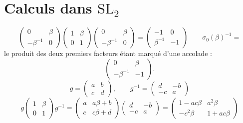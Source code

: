 \documentclass[11pt,a4paper]{article}
\begin{document}
\section{Calculs dans $\mathrm{SL}_2$}

\[
\begin{pmatrix} 0 & \beta \\ -\beta^{-1} & 0 \end{pmatrix}
\begin{pmatrix} 1 & \beta \\ 0 & 1 \end{pmatrix}
\begin{pmatrix} 0 & \beta \\ -\beta^{-1} & 0 \end{pmatrix}
= \begin{pmatrix} -1 & 0 \\ \beta^{-1} & -1 \end{pmatrix}
\qquad \sigma_0(\beta)^{-1} =
\]
le produit des deux premiers facteurs étant marqué d'une accolade :
\[
\begin{pmatrix} 0 & \beta \\ -\beta^{-1} & -1 \end{pmatrix}.
\]
\[
g = \begin{pmatrix} a & b \\ c & d \end{pmatrix}, \qquad
g^{-1} = \begin{pmatrix} d & -b \\ -c & a \end{pmatrix}
\]
\[
g \begin{pmatrix} 1 & \beta \\ 0 & 1 \end{pmatrix} g^{-1}
= \begin{pmatrix} a & a\beta + b \\ c & c\beta + d \end{pmatrix}
\begin{pmatrix} d & -b \\ -c & a \end{pmatrix}
= \begin{pmatrix} 1 - ac\beta & a^2\beta \\ -c^2\beta & 1 + ac\beta \end{pmatrix}
\]
\end{document}
